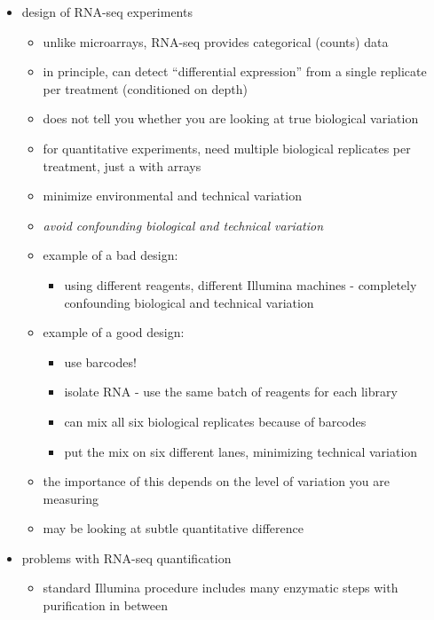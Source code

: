 \documentclass{article}
\begin{document}
\begin{itemize}
\begin{itemize}
        \end{itemize}
        \item design of RNA-seq experiments
        \begin{itemize}
            \item unlike microarrays, RNA-seq provides categorical (counts) data
            \item in principle, can detect ``differential expression'' from a single replicate per treatment (conditioned on depth)
            \item does not tell you whether you are looking at true biological variation
            \item for quantitative experiments, need multiple biological replicates per treatment, just a with arrays
            \item minimize environmental and technical variation
            \item \emph{avoid confounding biological and technical variation}
            \item example of a bad design:
            \begin{itemize}
                \item using different reagents, different Illumina machines - completely confounding biological and technical variation
            \end{itemize}
            \item example of a good design:
            \begin{itemize}
                \item use barcodes!
                \item isolate RNA - use the same batch of reagents for each library
                \item can mix all six biological replicates because of barcodes
                \item put the mix on six different lanes, minimizing technical variation
            \end{itemize}
            \item the importance of this depends on the level of variation you are measuring
            \item may be looking at subtle quantitative difference
        \end{itemize}
        \item problems with RNA-seq quantification
        \begin{itemize}
            \item standard Illumina procedure includes many enzymatic steps with purification in between

\end{itemize}
\end{itemize}
\end{document}
